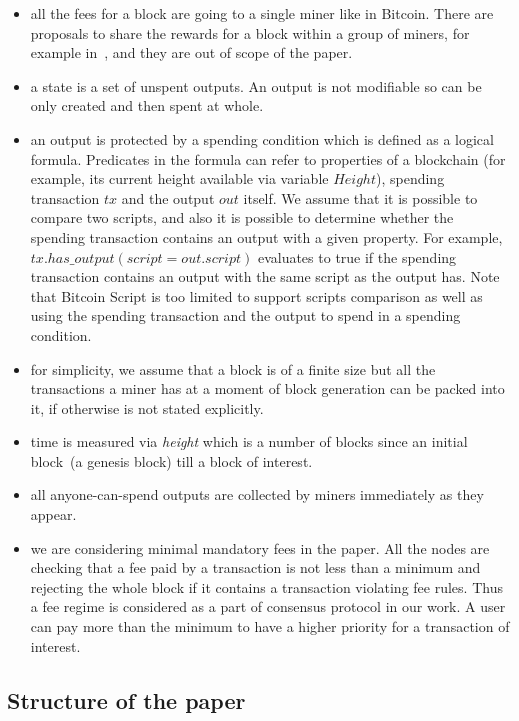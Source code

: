 \documentclass[]{llncs}   %
\begin{document}
\begin{itemize}
  \item{} all the fees for a block are going to a single miner like in Bitcoin.
      There are proposals to share the rewards for a block within a group of
      miners, for example in~\cite{eyal2016bitcoin,kogias2016enhancing}, and
      they are out of scope of the paper.
  \item{} a state is a set of unspent outputs. An output is not modifiable so
      can be only created and then spent at whole. 
  \item{} an output is protected by a spending condition which is defined as a
      logical formula. Predicates in the formula can refer to properties of a
      blockchain (for example, its current height available via variable
      $Height$), spending transaction $tx$ and the output $out$ itself. We
      assume that it is possible to compare two scripts, and also it is possible
      to determine whether the spending transaction contains an output with a
      given property. For example, $tx.has\_output(script = out.script)$
      evaluates to true if the spending transaction contains an output with the
      same script as the output has. Note that Bitcoin Script is too limited to
      support scripts comparison as well as using the spending transaction and
      the output to spend in a spending condition.
  \item{} for simplicity, we assume that a block is of a finite size but all the
      transactions a miner has at a moment of block generation can be packed
      into it, if otherwise is not stated explicitly.
  \item{} time is measured via \textit{height} which is a number of blocks since
      an initial block~(a genesis block) till a block of interest. 
  \item{} all anyone-can-spend outputs are collected by miners immediately as
      they appear.
  \item{} we are considering minimal mandatory fees in the paper. All the nodes
      are checking that a fee paid by a transaction is not less than a minimum
      and rejecting the whole block if it contains a transaction violating fee
      rules. Thus a fee regime is considered as a part of consensus protocol in
      our work. A user can pay more than the minimum to have a higher priority
      for a transaction of interest.   
\end{itemize}

\subsection{Structure of the paper}
\end{document}
